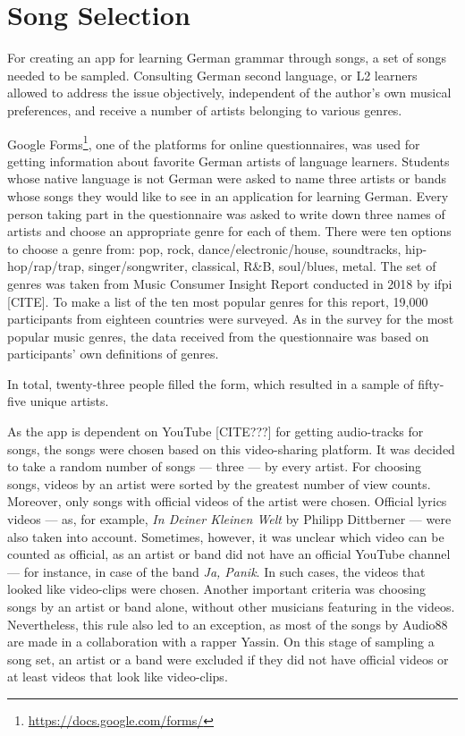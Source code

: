 \chapter{Song Selection}
\label{sec:selection}

For creating an app for learning German grammar through songs, a set of songs needed to be sampled. Consulting German second language, or L2 learners allowed to address the issue objectively, independent of the author's own musical preferences, and receive a number of artists belonging to various genres.

Google Forms\footnote{\url{https://docs.google.com/forms/}}, one of the platforms for online questionnaires, was used for getting information about favorite German artists of language learners. Students whose native language is not German were asked to name three artists or bands whose songs they would like to see in an application for learning German. Every person taking part in the questionnaire was asked to write down three names of artists and choose an appropriate genre for each of them. There were ten options to choose a genre from: pop, rock, dance/electronic/house, soundtracks, hip-hop/rap/trap, singer/songwriter, classical, R&B, soul/blues, metal. The set of genres was taken from Music Consumer Insight Report conducted in 2018 by ifpi [CITE]. To make a list of the ten most popular genres for this report, 19,000 participants from eighteen countries were surveyed. As in the survey for the most popular music genres, the data received from the questionnaire was based on participants' own definitions of genres.

In total, twenty-three people filled the form, which resulted in a sample of fifty-five unique artists.

As the app is dependent on YouTube [CITE???] for getting audio-tracks for songs, the songs were chosen based on this video-sharing platform. It was decided to take a random number of songs --- three --- by every artist. For choosing songs, videos by an artist were sorted by the greatest number of view counts. Moreover, only songs with official videos of the artist were chosen. Official lyrics videos --- as, for example, \textit{In Deiner Kleinen Welt} by Philipp Dittberner --- were also taken into account. Sometimes, however, it was unclear which video can be counted as official, as an artist or band did not have an official YouTube channel --- for instance, in case of the band \textit{Ja, Panik}. In such cases, the videos that looked like video-clips were chosen. Another important criteria was choosing songs by an artist or band alone, without other musicians featuring in the videos. Nevertheless, this rule also led to an exception, as most of the songs by Audio88 are made in a collaboration with a rapper Yassin. On this stage of sampling a song set, an artist or a band were excluded if they did not have official videos or at least videos that look like video-clips.

